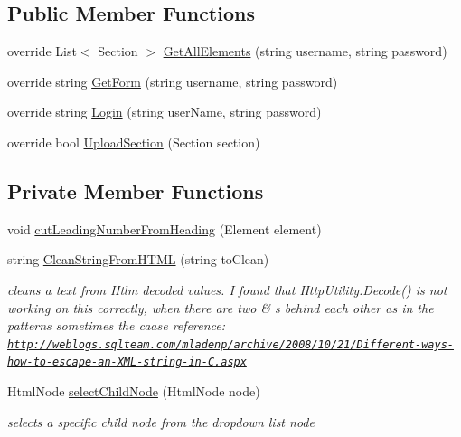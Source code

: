 \subsection*{Public Member Functions}
\begin{DoxyCompactItemize}
\item 
override List$<$ Section $>$ \hyperlink{class_wcf_service1_1_1_implementation___real_a6cedd1da2b421038727ed52afaf7197e}{Get\+All\+Elements} (string username, string password)
\item 
override string \hyperlink{class_wcf_service1_1_1_implementation___real_a82b0d0cc9a634454bfa583f55eb13dad}{Get\+Form} (string username, string password)
\item 
override string \hyperlink{class_wcf_service1_1_1_implementation___real_aec1081c3a83135e9f11ea182ca3e9321}{Login} (string user\+Name, string password)
\item 
override bool \hyperlink{class_wcf_service1_1_1_implementation___real_ac95892552f6beb92e0557abde468a5a1}{Upload\+Section} (Section section)
\end{DoxyCompactItemize}
\subsection*{Private Member Functions}
\begin{DoxyCompactItemize}
\item 
void \hyperlink{class_wcf_service1_1_1_implementation___real_a15223fee34324eadbaf60510013d78c0}{cut\+Leading\+Number\+From\+Heading} (Element element)
\item 
string \hyperlink{class_wcf_service1_1_1_implementation___real_a79882899922f4204592c464a2cb6a71d}{Clean\+String\+From\+H\+T\+ML} (string to\+Clean)
\begin{DoxyCompactList}\small\item\em cleans a text from Htlm decoded values. I found that Http\+Utility.\+Decode() is not working on this correctly, when there are two \& \textquotesingle{}s behind each other as in the patterns sometimes the caase reference\+: \href{http://weblogs.sqlteam.com/mladenp/archive/2008/10/21/Different-ways-how-to-escape-an-XML-string-in-C.aspx}{\tt http\+://weblogs.\+sqlteam.\+com/mladenp/archive/2008/10/21/\+Different-\/ways-\/how-\/to-\/escape-\/an-\/\+X\+M\+L-\/string-\/in-\/\+C.\+aspx} \end{DoxyCompactList}\item 
Html\+Node \hyperlink{class_wcf_service1_1_1_implementation___real_ac320b296695abc0db1ff6266f7d39dda}{select\+Child\+Node} (Html\+Node node)
\begin{DoxyCompactList}\small\item\em selects a specific child node from the dropdown list node \end{DoxyCompactList}\end{DoxyCompactItemize}
